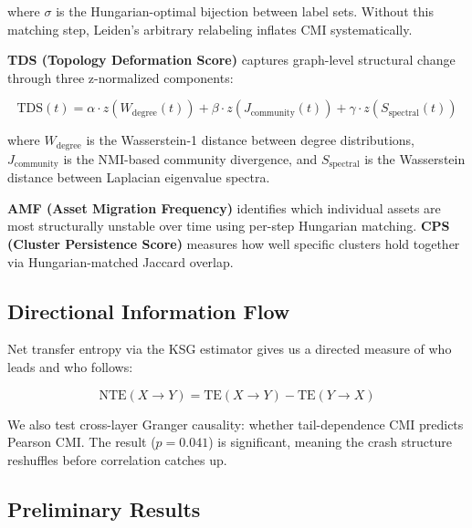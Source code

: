 \documentclass[12pt, letterpaper]{article}
\begin{document}
where $\sigma$ is the Hungarian-optimal bijection \cite{kuhn1955} between label sets. Without this matching step, Leiden's arbitrary relabeling inflates CMI systematically.

\textbf{TDS (Topology Deformation Score)} captures graph-level structural change through three z-normalized components:

\begin{equation}
    \text{TDS}(t) = \alpha \cdot z\!\left(W_{\text{degree}}(t)\right) + \beta \cdot z\!\left(J_{\text{community}}(t)\right) + \gamma \cdot z\!\left(S_{\text{spectral}}(t)\right)
\end{equation}

where $W_{\text{degree}}$ is the Wasserstein-1 distance between degree distributions, $J_{\text{community}}$ is the NMI-based community divergence, and $S_{\text{spectral}}$ is the Wasserstein distance between Laplacian eigenvalue spectra.

\textbf{AMF (Asset Migration Frequency)} identifies which individual assets are most structurally unstable over time using per-step Hungarian matching. \textbf{CPS (Cluster Persistence Score)} measures how well specific clusters hold together via Hungarian-matched Jaccard overlap.

\subsection{Directional Information Flow}

Net transfer entropy via the KSG estimator gives us a directed measure of who leads and who follows:

\begin{equation}
    \text{NTE}(X \to Y) = \text{TE}(X \to Y) - \text{TE}(Y \to X)
\end{equation}

We also test cross-layer Granger causality: whether tail-dependence CMI predicts Pearson CMI. The result ($p = 0.041$) is significant, meaning the crash structure reshuffles before correlation catches up.

\subsection{Preliminary Results}
\end{document}
